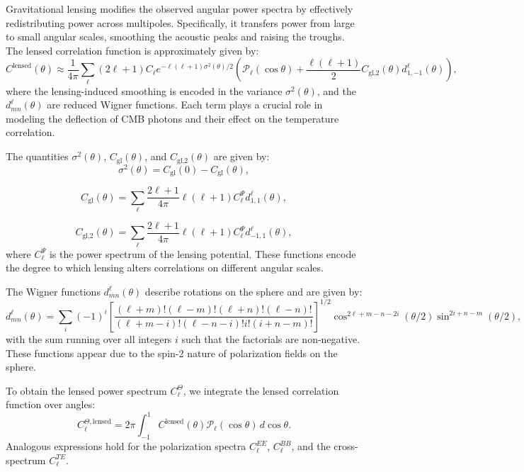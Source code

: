 \documentclass{aa}
\numberwithin{equation}{section}
\numberwithin{table}{section}
\numberwithin{figure}{section}
\begin{document}
Gravitational lensing modifies the observed angular power spectra by effectively redistributing power across multipoles. Specifically, it transfers power from large to small angular scales, smoothing the acoustic peaks and raising the troughs. The lensed correlation function is approximately given by:
\begin{equation}
C^\text{lensed}(\theta) \approx \frac{1}{4\pi} \sum_\ell (2\ell + 1) C_\ell e^{-\ell(\ell+1)\sigma^2(\theta)/2} \left( \mathcal{P}_\ell(\cos\theta) + \frac{\ell(\ell+1)}{2} C_\text{gl,2}(\theta) d^{\ell}_{1,-1}(\theta) \right),
\end{equation}
where the lensing-induced smoothing is encoded in the variance $\sigma^2(\theta)$, and the $d^\ell_{mn}(\theta)$ are reduced Wigner functions. Each term plays a crucial role in modeling the deflection of CMB photons and their effect on the temperature correlation.

The quantities $\sigma^2(\theta)$, $C_\text{gl}(\theta)$, and $C_\text{gl,2}(\theta)$ are given by:
\begin{equation}
\sigma^2(\theta) = C_\text{gl}(0) - C_\text{gl}(\theta),
\end{equation}

\begin{equation}
C_\text{gl}(\theta) = \sum_\ell \frac{2\ell + 1}{4\pi} \ell(\ell+1) C_\ell^\Psi d_{1,1}^\ell(\theta),
\end{equation}

\begin{equation}
C_\text{gl,2}(\theta) = \sum_\ell \frac{2\ell + 1}{4\pi} \ell(\ell+1) C_\ell^\Psi d_{-1,1}^\ell(\theta),
\end{equation}
where $C_\ell^\Psi$ is the power spectrum of the lensing potential. These functions encode the degree to which lensing alters correlations on different angular scales.

The Wigner functions $d^\ell_{mn}(\theta)$ describe rotations on the sphere and are given by:
\begin{equation}
d^\ell_{mn}(\theta) = \sum_i (-1)^i \left[ \frac{(\ell + m)! (\ell - m)! (\ell + n)! (\ell - n)!}{(\ell + m - i)! (\ell - n - i)! i! (i + n - m)!} \right]^{1/2} \cos^{2\ell + m - n - 2i}(\theta/2) \sin^{2i + n - m}(\theta/2),
\end{equation}
with the sum running over all integers $i$ such that the factorials are non-negative. These functions appear due to the spin-2 nature of polarization fields on the sphere.

To obtain the lensed power spectrum $C_\ell^\Theta$, we integrate the lensed correlation function over angles:
\begin{equation}
C_\ell^{\Theta, \text{lensed}} = 2\pi \int_{-1}^{1} C^\text{lensed}(\theta) \mathcal{P}_\ell(\cos\theta) \, d\cos\theta.
\end{equation}
Analogous expressions hold for the polarization spectra $C_\ell^{EE}$, $C_\ell^{BB}$, and the cross-spectrum $C_\ell^{TE}$.
\end{document}
